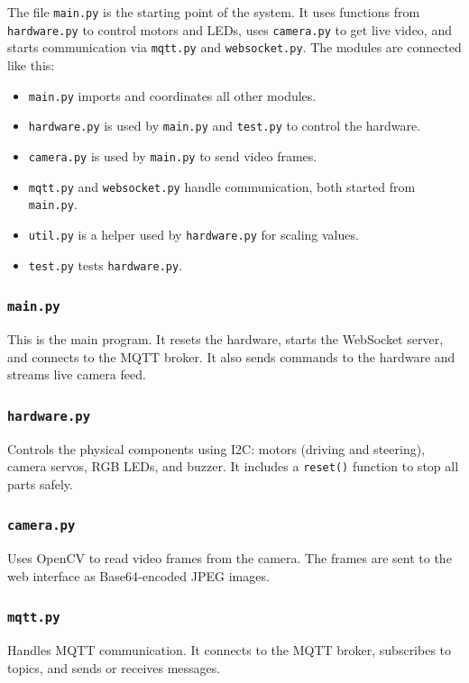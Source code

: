     The file \texttt{main.py} is the starting point of the system. It uses functions from \texttt{hardware.py} to control motors and LEDs, uses \texttt{camera.py} to get live video, and starts communication via \texttt{mqtt.py} and \texttt{websocket.py}.
    The modules are connected like this:
    \begin{itemize}[noitemsep, topsep=0pt]
        \item \texttt{main.py} imports and coordinates all other modules.
        \item \texttt{hardware.py} is used by \texttt{main.py} and \texttt{test.py} to control the hardware.
        \item \texttt{camera.py} is used by \texttt{main.py} to send video frames.
        \item \texttt{mqtt.py} and \texttt{websocket.py} handle communication, both started from \texttt{main.py}.
        \item \texttt{util.py} is a helper used by \texttt{hardware.py} for scaling values.
        \item \texttt{test.py} tests \texttt{hardware.py}.
    \end{itemize}

    \subsubsection*{\texttt{main.py}}
    This is the main program. It resets the hardware, starts the WebSocket server, and connects to the MQTT broker. It also sends commands to the hardware and streams live camera feed.

    \subsubsection*{\texttt{hardware.py}}
    Controls the physical components using I2C: motors (driving and steering), camera servos, RGB LEDs, and buzzer. It includes a \texttt{reset()} function to stop all parts safely.

    \subsubsection*{\texttt{camera.py}}
    Uses OpenCV to read video frames from the camera. The frames are sent to the web interface as Base64-encoded JPEG images.

    \subsubsection*{\texttt{mqtt.py}}
    Handles MQTT communication. It connects to the MQTT broker, subscribes to topics, and sends or receives messages.


